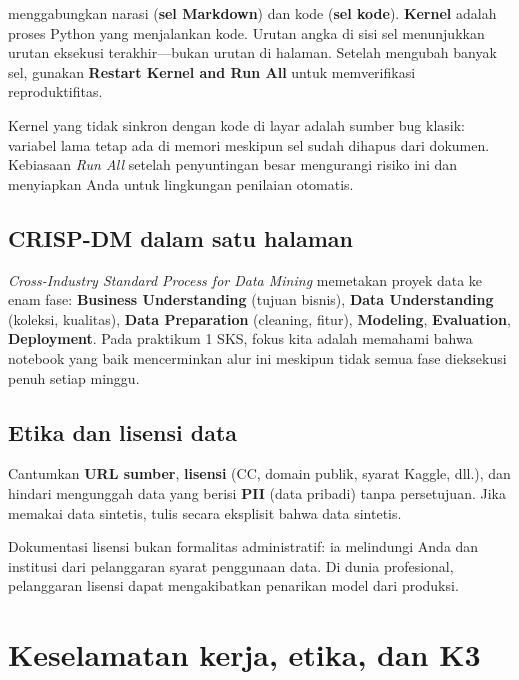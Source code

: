 \documentclass[../main.tex]{subfiles}
\begin{document}
\begin{konsep}
\jupyter{} menggabungkan narasi (\textbf{sel Markdown}) dan kode (\textbf{sel kode}). \textbf{Kernel} adalah proses Python yang menjalankan kode. Urutan angka di sisi sel menunjukkan urutan eksekusi terakhir---bukan urutan di halaman. Setelah mengubah banyak sel, gunakan \textbf{Restart Kernel and Run All} untuk memverifikasi reproduktifitas.
\end{konsep}

Kernel yang tidak sinkron dengan kode di layar adalah sumber bug klasik: variabel lama tetap ada di memori meskipun sel sudah dihapus dari dokumen. Kebiasaan \textit{Run All} setelah penyuntingan besar mengurangi risiko ini dan menyiapkan Anda untuk lingkungan penilaian otomatis.

\subsection{CRISP-DM dalam satu halaman}

\textit{Cross-Industry Standard Process for Data Mining} memetakan proyek data ke enam fase: \textbf{Business Understanding} (tujuan bisnis), \textbf{Data Understanding} (koleksi, kualitas), \textbf{Data Preparation} (cleaning, fitur), \textbf{Modeling}, \textbf{Evaluation}, \textbf{Deployment}. Pada praktikum 1 SKS, fokus kita adalah memahami bahwa notebook yang baik mencerminkan alur ini meskipun tidak semua fase dieksekusi penuh setiap minggu.



\subsection{Etika dan lisensi data}

\begin{catatan}
Cantumkan \textbf{URL sumber}, \textbf{lisensi} (CC, domain publik, syarat Kaggle, dll.), dan hindari mengunggah data yang berisi \textbf{PII} (data pribadi) tanpa persetujuan. Jika memakai data sintetis, tulis secara eksplisit bahwa data sintetis.
\end{catatan}

Dokumentasi lisensi bukan formalitas administratif: ia melindungi Anda dan institusi dari pelanggaran syarat penggunaan data. Di dunia profesional, pelanggaran lisensi dapat mengakibatkan penarikan model dari produksi.

\section{Keselamatan kerja, etika, dan K3}
\end{document}
